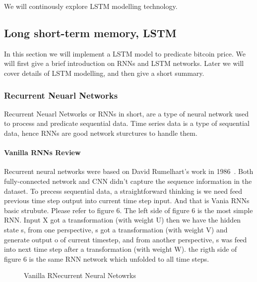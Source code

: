 \documentclass[10pt,twocolumn,letterpaper]{article}
\begin{document}
We will continously explore LSTM modelling technology.

\subsection{Long short-term memory, LSTM}

In this section we will implement a LSTM model to predicate bitcoin price. We will first give a brief introduction on RNNs and LSTM networks. Later we will cover details of LSTM modelling, and then give a short summary.

\subsubsection{Recurrent Neuarl Networks}

Recurrent Neuarl Networks  or RNNs in short, are a type of neural network used to process and predicate sequential data. Time series data is a type of sequential data, hence RNNs are good network sturctures to handle them.

\paragraph{Vanilla RNNs Review}
\par
Recurrent neural networks were based on David Rumelhart's work in 1986~\cite{Authors10}. Both fully-connected network and CNN didn't capture the sequence information in the dataset. To precess sequential data, a straightforward thinking is we need feed previous time step output into current time step input. And that is Vania RNNs basic strubute. Please refer to figure 6. The left side of figure 6 is the most simple RNN. Input X got a transformation (with weight U) then we have the hidden state s, from one perspective, s got a transformation (with weight V) and generate output o of current timestep, and from another perspective, s was feed into next time step after a transformation (with weight W). the rigth side of figure 6 is the same RNN network which unfolded to all time steps.

\begin{figure}[H]
\begin{center}
\end{center}
   \caption{Vanilla RNecurrent Neural Netowrks\cite{Authors12}}
\end{figure}
\end{document}
